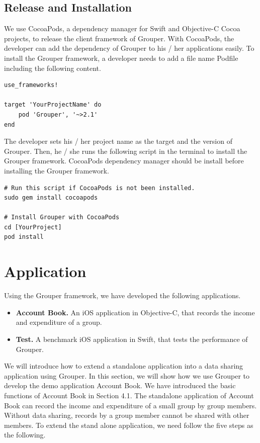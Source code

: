 \documentclass[a4paper,11pt]{report}
\begin{document}
\subsection{Release and Installation}

We use CocoaPods\cite{cocoapods}, a dependency manager for Swift and Objective-C Cocoa projects, to release the client framework of Grouper.
With CocoaPods, the developer can add the dependency of Grouper to his / her applications easily.
To install the Grouper framework, a developer needs to add a file name Podfile including the following content.

\begin{lstlisting}[frame=none language=Ruby] 
use_frameworks!

target 'YourProjectName' do
    pod 'Grouper', '~>2.1'
end
\end{lstlisting}

The developer sets his / her project name as the target and the version of Grouper.
Then, he / she runs the following script in the terminal to install the Grouper framework.
CocoaPods dependency manager should be install before installing the Grouper framework.

\begin{lstlisting}[frame=none language=shell] 
# Run this script if CocoaPods is not been installed.
sudo gem install cocoapods

# Install Grouper with CocoaPods
cd [YourProject]
pod install
\end{lstlisting}

\section{Application} \label{section:application}

Using the Grouper framework, we have developed the following applications. 

\begin{itemize}
	\setlength{\itemsep}{1pt}
	\setlength{\parskip}{0pt}
	\setlength{\parsep}{0pt}
	\item \textbf{Account Book.} An iOS application in Objective-C, that records the income and expenditure of a group.
	\item \textbf{Test.} A benchmark iOS application in Swift, that tests the performance of Grouper.
\end{itemize}

We will introduce how to extend a standalone application into a data sharing application using Grouper.
In this section, we will show how we use Grouper to develop the demo application Account Book.
We have introduced the basic functions of Account Book in Section 4.1.
The standalone application of Account Book can record the income and expenditure of a small group by group members.
Without data sharing, records by a group member cannot be shared with other members.
To extend the stand alone application, we need follow the five steps as the following.
\end{document}
